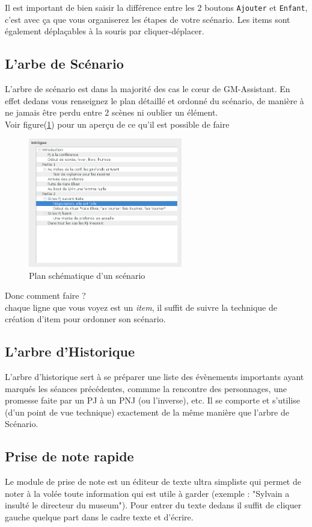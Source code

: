 \documentclass[a4paper,12pt]{article}
\newcommand*{\GMA}{GM-Assistant\xspace}
\newcommand*{\interfaceitem}[1]{\texttt{#1}}
\newcommand*{\guillemets}[1]{\og #1\fg{}\xspace}
\begin{document}
Il est important de bien saisir la différence entre les 2 boutons \interfaceitem{Ajouter} et \interfaceitem{Enfant}, c'est avec ça que vous organiserez les étapes de votre scénario.
Les items sont également déplaçables à la souris par \guillemets{cliquer-déplacer}.

\subsection{L'arbe de Scénario}\label{scenario}
L'arbre de scénario est dans la majorité des cas le cœur de \GMA. En effet dedans vous renseignez le plan détaillé et ordonné du scénario, de manière à ne jamais être perdu entre 2 scènes ni oublier un élément.
\\
Voir figure(\ref{arbre_scenar}) pour un aperçu de ce qu'il est possible de faire
\begin{figure}[h]
    \includegraphics[width=0.6\textwidth]{scenario_type}
    \caption{Plan schématique d'un scénario}
    \label{arbre_scenar}
\end{figure}
Donc comment faire ?
\\
chaque ligne que vous voyez est un \emph{item}, il suffit de suivre la technique de création d'item pour ordonner son scénario.
\subsection{L'arbre d'Historique}\label{historique}
L'arbre d'historique sert à se préparer une liste des évènements importants ayant marqués les séances précédentes, commme la rencontre des personnages, une promesse faite par un PJ à un PNJ (ou l'inverse), etc.
Il se comporte et s'utilise (d'un point de vue technique) exactement de la même manière que l'arbre de Scénario.


\subsection{Prise de note rapide}
Le module de prise de note est un éditeur de texte ultra simpliste qui permet de noter à la volée toute information qui est utile à garder (exemple : "Sylvain a insulté le directeur du museum"). Pour entrer du texte dedans il suffit de cliquer gauche quelque part dans le cadre texte et d'écrire.
\\
\end{document}
